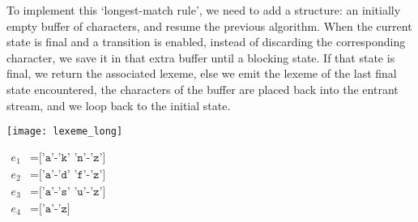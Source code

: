 To implement this `longest\hyp{}match rule', we need to add a
structure: an initially empty buffer of characters, and resume the
previous algorithm. When the current state is final and a transition
is enabled, instead of discarding the corresponding character, we save
it in that extra buffer until a blocking state. If that state is
final, we return the associated lexeme, else we emit the lexeme of the
last final state encountered, the characters of the buffer are placed
back into the entrant stream, and we loop back to the initial state.
\begin{center}
\begin{minipage}{0.45\linewidth}
\texttt{[image: lexeme\_long]}
\end{minipage}
\hspace*{15mm}
\begin{minipage}{0.4\linewidth}
$\begin{aligned}
  e_1 &= \texttt{['a'-'k' 'n'-'z']}\\
  e_2 &= \texttt{['a'-'d' 'f'-'z']}\\
  e_3 &= \texttt{['a'-'s' 'u'-'z']}\\
  e_4 &= \texttt{['a'-'z]}
\end{aligned}$
\end{minipage}
\end{center}
